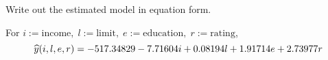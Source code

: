 Write out the estimated model in equation form.

\soln* For $i := \text{income},\; l := \text{limit},\; e := \text{education},\; r:= \text{rating}$, $$\widehat{y}(i,l,e,r) = -517.34829 - 7.71604i + 0.08194l + 1.91714e + 2.73977r$$
